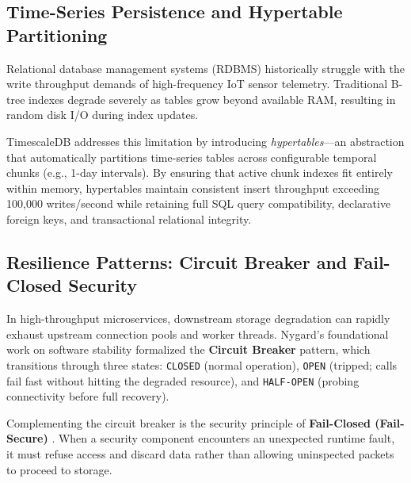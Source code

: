 \subsection{Time-Series Persistence and Hypertable Partitioning}
Relational database management systems (RDBMS) historically struggle with the write throughput demands of high-frequency IoT sensor telemetry. Traditional B-tree indexes degrade severely as tables grow beyond available RAM, resulting in random disk I/O during index updates.

TimescaleDB \cite{timescaledb_paper} addresses this limitation by introducing \emph{hypertables}---an abstraction that automatically partitions time-series tables across configurable temporal chunks (e.g., 1-day intervals). By ensuring that active chunk indexes fit entirely within memory, hypertables maintain consistent insert throughput exceeding 100,000 writes/second while retaining full SQL query compatibility, declarative foreign keys, and transactional relational integrity.

\subsection{Resilience Patterns: Circuit Breaker and Fail-Closed Security}
In high-throughput microservices, downstream storage degradation can rapidly exhaust upstream connection pools and worker threads. Nygard's foundational work on software stability \cite{nygard2018release} formalized the \textbf{Circuit Breaker} pattern, which transitions through three states: \texttt{CLOSED} (normal operation), \texttt{OPEN} (tripped; calls fail fast without hitting the degraded resource), and \texttt{HALF-OPEN} (probing connectivity before full recovery).

Complementing the circuit breaker is the security principle of \textbf{Fail-Closed (Fail-Secure)} \cite{saltzer1975protection}. When a security component encounters an unexpected runtime fault, it must refuse access and discard data rather than allowing uninspected packets to proceed to storage.
